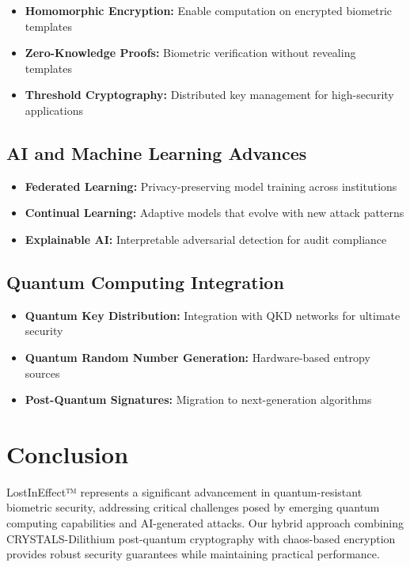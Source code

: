 \documentclass[12pt,a4paper]{article}
\begin{document}
\begin{itemize}
    \item \textbf{Homomorphic Encryption:} Enable computation on encrypted biometric templates
    \item \textbf{Zero-Knowledge Proofs:} Biometric verification without revealing templates
    \item \textbf{Threshold Cryptography:} Distributed key management for high-security applications
\end{itemize}

\subsection{AI and Machine Learning Advances}

\begin{itemize}
    \item \textbf{Federated Learning:} Privacy-preserving model training across institutions
    \item \textbf{Continual Learning:} Adaptive models that evolve with new attack patterns
    \item \textbf{Explainable AI:} Interpretable adversarial detection for audit compliance
\end{itemize}

\subsection{Quantum Computing Integration}

\begin{itemize}
    \item \textbf{Quantum Key Distribution:} Integration with QKD networks for ultimate security
    \item \textbf{Quantum Random Number Generation:} Hardware-based entropy sources
    \item \textbf{Post-Quantum Signatures:} Migration to next-generation algorithms
\end{itemize}

\section{Conclusion}

LostInEffect™ represents a significant advancement in quantum-resistant biometric security, addressing critical challenges posed by emerging quantum computing capabilities and AI-generated attacks. Our hybrid approach combining CRYSTALS-Dilithium post-quantum cryptography with chaos-based encryption provides robust security guarantees while maintaining practical performance.
\end{document}
